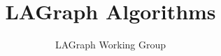 \documentclass{article}
\begin{document}
\title{LAGraph Algorithms}

\author{LAGraph Working Group}

\maketitle

\begin{abstract}

\end{abstract}






\clearpage



\end{document}
